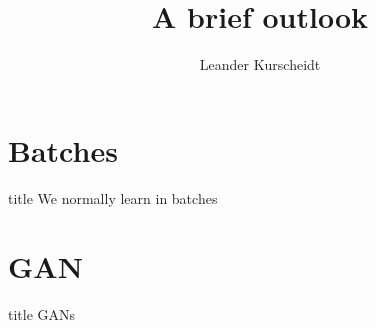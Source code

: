 \documentclass[18pt]{beamer}
\title[A brief outlook]{A brief outlook}
\author{Leander Kurscheidt}
\begin{document}

\begin{frame}
\titlepage
\end{frame}


\section{Batches}
\begin{frame}
    \vfill
    \centering
    \begin{beamercolorbox}[sep=8pt,center,shadow=true,rounded=true]{title}
      We normally learn in batches
    \end{beamercolorbox}
    \vfill
\end{frame}

\section{GAN}
\begin{frame}
    \vfill
    \centering
    \begin{beamercolorbox}[sep=8pt,center,shadow=true,rounded=true]{title}
      GANs
    \end{beamercolorbox}
    \vfill
\end{frame}
\end{document}
